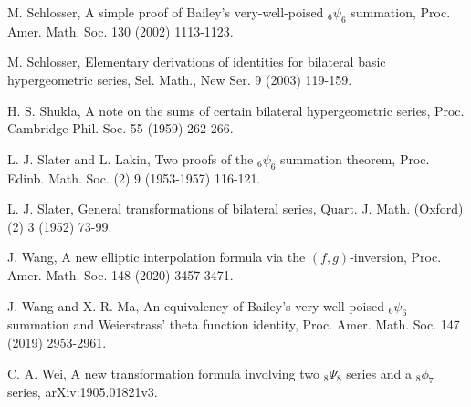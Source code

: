\documentclass[xits,review,sort&compress]{elsarticle}
\numberwithin{equation}{section}
\begin{document}
\begin{thebibliography}{2005}
M. Schlosser, A simple proof of Bailey's very-well-poised ${}_6\psi_6$ summation, Proc. Amer. Math. Soc. 130 (2002) 1113-1123.

M. Schlosser,  Elementary derivations of identities for bilateral basic hypergeometric series,  Sel. Math., New Ser. 9  (2003) 119-159.


 H. S. Shukla, A note on the sums of certain bilateral hypergeometric series,  Proc. Cambridge Phil. Soc. 55 (1959) 262-266.


 L. J. Slater and L. Lakin, Two proofs of the ${}_6\psi_6$ summation theorem, Proc. Edinb. Math. Soc. (2) 9 (1953-1957) 116-121.

 L. J. Slater, General transformations of bilateral series, Quart. J. Math. (Oxford)(2) 3 (1952) 73-99.


J. Wang, A new elliptic interpolation formula via the $(f,g)$-inversion, Proc. Amer. Math. Soc. 148 (2020)  3457-3471.

J. Wang and  X. R. Ma, An equivalency of Bailey's very-well-poised ${} _6\psi_6$ summation and Weierstrass' theta function identity, Proc. Amer. Math. Soc. 147 (2019) 2953-2961.



C. A. Wei, A new transformation formula involving two  ${}_8\Psi_8$ series and a ${}_8\phi_7$ series,  arXiv:1905.01821v3.

\end{thebibliography}

 
\end{document}
